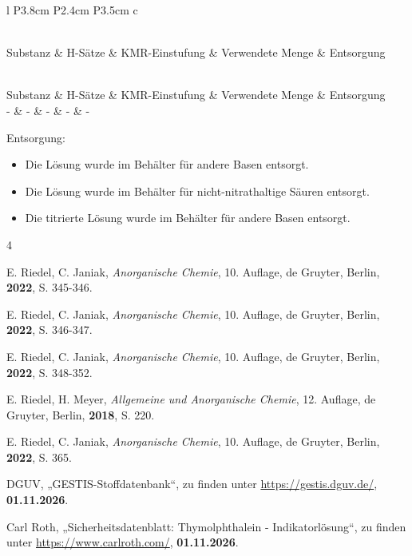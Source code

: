 \documentclass[
	a4paper,										%
	12pt,											%
	twoside,										%
	headsepline,								%
	footsepline,									%
	captions=tableheading,					%
]{scrartcl}
\newcommand{\langetabelle}[6]{  %
	\begin{centering}           %
		{\begin{longtable}[#3]{#4}
				\caption{#2\label{tab: #1}}\\				
				\hline
				#5
				\hline
				\endfirsthead
                \caption{#2\label{tab: #1}}\\
				\hline
				#5
				\hline
				\endhead
				#6												
				\hline 
		\end{longtable}}
\end{centering}}
\begin{document}
\langetabelle
	{KMR_leer}
	{Verwendete kanzerogene, mutagene oder reproduktionstoxische Gefahrstoffe (KMR).}
	{H}
	{l P{3.8cm} P{2.4cm} P{3.5cm} c}
	{Substanz & H-Sätze & KMR-Einstufung & Verwendete Menge & Entsorgung \\}
	{ - & - & - & - & - \\}
	
Entsorgung: \\
\begin{itemize}
	\item[(1)] Die Lösung wurde im Behälter für andere Basen entsorgt.
	\item[(2)] Die Lösung wurde im Behälter für nicht-nitrathaltige Säuren entsorgt.
    \item[(3)] Die titrierte Lösung wurde im Behälter für andere Basen entsorgt.
\end{itemize}	


\begin{thebibliography}{4} %

						{E. Riedel, C. Janiak}, 
			\textit	{Anorganische Chemie}, 
						{10. Auflage}, 
						{de Gruyter}, 
						{Berlin}, 
			\textbf	{2022}, 
			S.			{345-346}.

						{E. Riedel, C. Janiak}, 
			\textit	{Anorganische Chemie}, 
						{10. Auflage}, 
						{de Gruyter}, 
						{Berlin}, 
			\textbf	{2022}, 
			S.			{346-347}.

						{E. Riedel, C. Janiak}, 
			\textit	{Anorganische Chemie}, 
						{10. Auflage}, 
						{de Gruyter}, 
						{Berlin}, 
			\textbf	{2022}, 
			S.			{348-352}.

						{E. Riedel, H. Meyer}, 
			\textit	{Allgemeine und Anorganische Chemie}, 
						{12. Auflage}, 
						{de Gruyter}, 
						{Berlin}, 
			\textbf	{2018}, 
			S.			{220}.

						{E. Riedel, C. Janiak}, 
			\textit	{Anorganische Chemie}, 
						{10. Auflage}, 
						{de Gruyter}, 
						{Berlin}, 
			\textbf	{2022}, 
			S.			{365}.

						{DGUV}, 
						„{GESTIS-Stoffdatenbank}“, zu finden unter 
			\url		{https://gestis.dguv.de/}, 
			\textbf	{01.11.2026}.
	
						{Carl Roth}, 
						„{Sicherheitsdatenblatt: Thymolphthalein - Indikatorlösung}“, zu finden unter 
			\url		{https://www.carlroth.com/}, 
			\textbf	{01.11.2026}.
			
\end{thebibliography}
\end{document}

